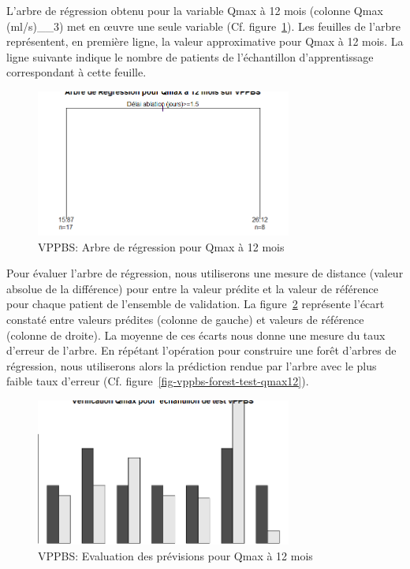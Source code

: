 L'arbre de régression obtenu pour la variable Qmax à 12 mois (colonne Qmax (ml/s)\_\_3) met en {\oe}uvre une seule variable (Cf. figure~\ref{fig-vppbs-regtree-qmax12}). Les feuilles de l'arbre représentent, en première ligne, la valeur approximative pour Qmax à 12 mois. La ligne suivante indique le nombre de patients de l'échantillon d'apprentissage correspondant à cette feuille. 

\begin{figure}[H]
\centering
\includegraphics[width=0.75\textwidth]{../Fig/VPPBS/vppbs-regtree-qmax12.png}
\caption{VPPBS: Arbre de régression pour Qmax à 12 mois}
\label{fig-vppbs-regtree-qmax12}
\end{figure}

Pour évaluer l'arbre de régression, nous utiliserons une mesure de distance (valeur absolue de la différence) pour entre la valeur prédite et la valeur de référence pour chaque patient de l'ensemble de validation. 
La figure~\ref{fig-vppbs-regtree-test-qmax12} représente l'écart constaté entre valeurs prédites (colonne de gauche) et valeurs de référence (colonne de droite). La moyenne de ces écarts nous donne une mesure du taux d'erreur de l'arbre. En répétant l'opération pour construire une forêt d'arbres de régression, nous utiliserons alors la prédiction rendue par l'arbre avec le plus faible taux d'erreur (Cf. figure~\ref{fig-vppbs-forest-test-qmax12}).

\begin{figure}[H]
\centering
\includegraphics[width=0.75\textwidth]{../Fig/VPPBS/vppbs-regtree-test-qmax12.png}
\caption{VPPBS: Evaluation des prévisions pour Qmax à 12 mois}
\label{fig-vppbs-regtree-test-qmax12}
\end{figure}


